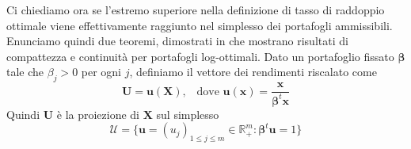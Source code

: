\documentclass[a4paper,11pt]{book}
\theoremstyle{plain}
\theoremstyle{definition}
\theoremstyle{remark}
\newcommand{\R}{\mathbb{R}}
\newcommand{\X}{\bm{X}}
\newcommand{\x}{\bm{x}}
\newcommand{\B}{\bm{b}}
\newcommand{\F}{\mathcal{F}}
\newcommand{\Pro}{\mathbf{P}}
\newcommand{\E}{\mathbf{E}}
\begin{document}
\iffalse
\begin{proof}
	Il teorema di convergenza di Lèvy per martingale per speranze condizionali per una funzione continua e limitata $f(x)$ afferma che
	\begin{equation*}
		\int{f}\text{d}\bar{\Pro}_t=\E[f(X)|\bar{\F}_t]\rightarrow \int{f\text{d}\bar{\Pro}_\infty} = \E[f(X)|\bar{\F}_\infty] \;\;\;\; \text{q.c.}
	\end{equation*}
	Questo dimostra il primo punto e il secondo grazie al teorema precedente (!!!). Basta notare che sia $\bar{\B}_t^*=\B^*(\bar{\Pro}_t)$ e $\bar{w}_t^*=w^*(\bar{\Pro}_t)$ sono $\bar{\F}_t$-misurabili, in quanto lo è $\bar{\Pro}_t$ e questa è composta a funzioni misurabili.\newline
	Se $0\leq s\leq t\leq\infty$ allora $\bar{\F}_s\subseteq \bar{\F}_t$, quindi portafogli $\bar{\F}_s$-misurabili sono anche $\bar{\F}_t$-misurabili. Segue quindi che
	\begin{equation*}
		\E [\log(\bar{\B}_s^*\X)|\bar{\F}_t]\leq \bar{w}_t^*=\sup\limits_{\B\in \bar{\F}_t} \E[\log(\B^t\X)|\bar{\F}_t]
	\end{equation*}
	Condizionando rispetto a $\bar{\F}_s$ si ha così che $\bar{w}_s^* =\E[\log(\bar{\B}_s^{*t}\X)|\bar{\F}_s]\leq \E[\bar{w}_t^*|\bar{\F}_s]$ e quindi $\{\bar{w}_t^*,\bar{\F}_t\}_{0\leq t<\infty}$ è una submartingala. Inoltre $\bar{W}_t^*$ è crescente in $t$, in quanto è un estremo superiore preso su un insieme sempre più grande per $t$ che cresce.\newline
	Rimane quindi da mostrare solo che $\bar{W}_t^*\uparrow \bar{W}_\infty^*$ e $\bar{w}_t^*\rightarrow \bar{w}_\infty^*$ quasi certamente (e in $L^1$ se $\bar{W}_\infty^*<\infty$). (FINIRE). 
\end{proof}
\fi
Ci chiediamo ora se l'estremo superiore nella definizione di tasso di raddoppio ottimale viene effettivamente raggiunto nel simplesso dei portafogli ammissibili. Enunciamo quindi due teoremi, dimostrati in \cite{algoet1988} che mostrano risultati di compattezza e continuità per portafogli log-ottimali.\newline
Dato un portafoglio fissato $\bm{\beta}$ tale che $\beta_j>0$ per ogni $j$, definiamo il vettore dei rendimenti riscalato come
\begin{equation*}
	\bm{U}=\bm{u}(\X), \;\;\; \text{dove } \bm{u}(\x) = \frac{\x}{\bm{\beta}^t\x}
\end{equation*}
Quindi $\bm{U}$ è la proiezione di $\X$ sul simplesso
\begin{equation*}
	\mathcal{U}=\{\bm{u}=(u_j)_{1\leq j\leq m}\in\R^m_+:\bm{\beta}^t\bm{u}=1\}
\end{equation*}
\end{document}
